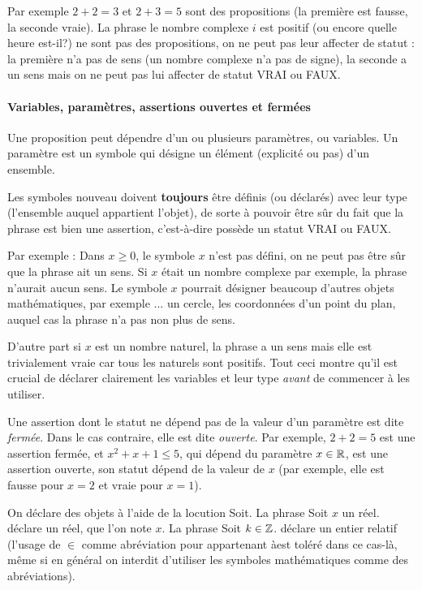 Par exemple \og$2+2=3$\fg{} et \og $2+3=5$\fg{} sont des propositions (la première est fausse, la seconde vraie). La phrase \og le nombre complexe $i$ est positif\fg{} (ou encore \og quelle heure est-il?\fg) ne sont pas des propositions, on ne peut pas leur affecter de statut : la première n'a pas de sens (un nombre complexe n'a pas de signe), la seconde a un sens mais on ne peut pas lui affecter de statut VRAI ou FAUX.\\
 
 
\paragraph{Variables, paramètres, assertions ouvertes et fermées}

Une proposition peut dépendre d'un ou plusieurs paramètres, ou variables. Un paramètre est un symbole qui désigne un élément (explicité ou pas) d'un ensemble.

Les symboles nouveau doivent \textbf{toujours} être définis (ou déclarés) avec leur type (l'ensemble auquel appartient l'objet), de sorte à pouvoir être sûr du fait que la phrase est bien une assertion, c'est-à-dire possède un statut VRAI ou FAUX.

Par exemple : Dans \og$x\geq 0$\fg, le symbole $x$ n'est pas défini, on ne peut pas être sûr que la phrase ait un sens. Si $x$ était un nombre complexe par exemple, la phrase n'aurait aucun sens. Le symbole $x$ pourrait désigner beaucoup d'autres objets mathématiques, par exemple ... un cercle, les coordonnées d'un point du plan, auquel cas la phrase n'a pas non plus de sens.

 D'autre part si $x$ est un nombre naturel, la phrase a un sens mais elle est trivialement vraie car tous les naturels sont positifs. Tout ceci montre qu'il est crucial de déclarer clairement les variables et leur type \emph{avant} de commencer à les utiliser.

Une assertion dont le statut ne dépend pas de la valeur d'un paramètre est dite \emph{fermée}. Dans le cas contraire, elle est dite \emph{ouverte}. Par exemple, \og $2+2=5$\fg{} est une assertion fermée, et $x^2+x+1\leq 5$, qui dépend du paramètre $x\in \mathbb{R}$, est une assertion ouverte, son statut dépend de la valeur de $x$ (par exemple, elle est fausse pour $x=2$ et vraie pour $x=1$).

On déclare des objets à l'aide de la locution \og Soit\fg. La phrase \og Soit $x$ un réel.\fg{} déclare un réel, que l'on note $x$. La phrase \og Soit $k\in \mathbb{Z}$.\fg{} déclare un entier relatif (l'usage de $\in$ comme abréviation pour \og appartenant à\fg est toléré dans ce cas-là, même si en général on interdit d'utiliser les symboles mathématiques comme des abréviations).

